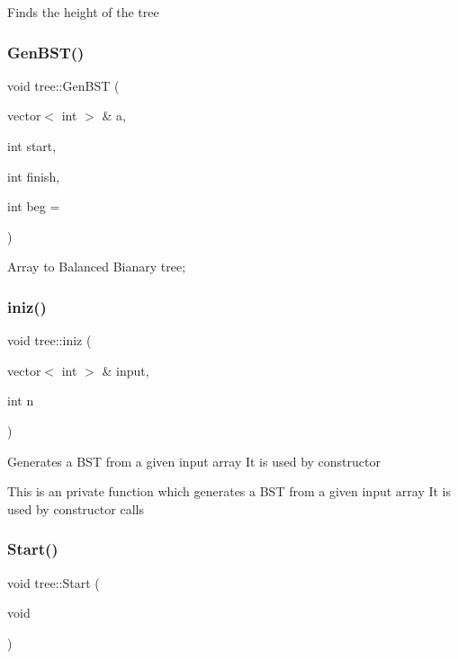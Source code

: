 Finds the height of the tree \mbox{\label{classtree_a5aa82979670b726692fdf9d0df4248de}} 
\subsubsection{\texorpdfstring{Gen\+B\+S\+T()}{GenBST()}}
{\footnotesize\ttfamily void tree\+::\+Gen\+B\+ST (\begin{DoxyParamCaption}\item[{vector$<$ int $>$ \&}]{a,  }\item[{int}]{start,  }\item[{int}]{finish,  }\item[{int}]{beg = {} }\end{DoxyParamCaption})\hspace{0.3cm}{\ttfamily [private]}}

Array to Balanced Bianary tree; \mbox{\label{classtree_a4dc5cf9375c65041ac594c810072be50}} 
\subsubsection{\texorpdfstring{iniz()}{iniz()}}
{\footnotesize\ttfamily void tree\+::iniz (\begin{DoxyParamCaption}\item[{vector$<$ int $>$ \&}]{input,  }\item[{int}]{n }\end{DoxyParamCaption})\hspace{0.3cm}{\ttfamily [private]}}

Generates a B\+ST from a given input array It is used by constructor

This is an private function which generates a B\+ST from a given input array It is used by constructor calls \mbox{\label{classtree_a48edff6ad24225010aa16b36182185d4}} 
\subsubsection{\texorpdfstring{Start()}{Start()}}
{\footnotesize\ttfamily void tree\+::\+Start (\begin{DoxyParamCaption}\item[{void}]{ }\end{DoxyParamCaption})}

